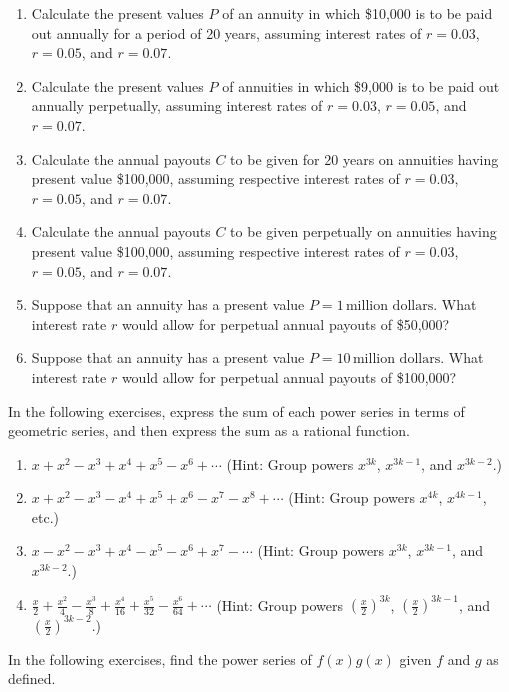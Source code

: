 \documentclass{exercises}
\begin{document}
\begin{enumerate}[resume]
\item Calculate the present values $P$ of an annuity in which \$10,000 is to be paid out annually for a period of 20 years, assuming interest rates of $r=0.03$, $r=0.05$, and $r=0.07$.
\item Calculate the present values $P$ of annuities in which \$9,000 is to be paid out annually perpetually, assuming interest rates of $r=0.03$, $r=0.05$, and $r=0.07$.
\item Calculate the annual payouts $C$ to be given for 20 years on annuities having present value \$100,000, assuming respective interest rates of $r=0.03$, $r=0.05$, and $r=0.07$.
\item Calculate the annual payouts $C$ to be given perpetually on annuities having present value \$100,000, assuming respective interest rates of $r=0.03$, $r=0.05$, and $r=0.07$.
\item Suppose that an annuity has a present value $P=1\,\text{million dollars}$. What interest rate $r$ would allow for perpetual annual payouts of \$50,000?
\item Suppose that an annuity has a present value $P=10\,\text{million dollars}$. What interest rate $r$ would allow for perpetual annual payouts of \$100,000?
\end{enumerate}

In the following exercises, express the sum of each power series in terms of geometric series, and then express the sum as a rational function.

\begin{enumerate}[resume]
\item $x+x^{2}-x^{3}+x^{4}+x^{5}-x^{6}+\cdots$ (Hint: Group powers $x^{3k}$, $x^{3k-1}$, and $x^{3k-2}$.)
\item $x+x^{2}-x^{3}-x^{4}+x^{5}+x^{6}-x^{7}-x^{8}+\cdots$ (Hint: Group powers $x^{4k}$, $x^{4k-1}$, etc.)
\item $x-x^{2}-x^{3}+x^{4}-x^{5}-x^{6}+x^{7}-\cdots$ (Hint: Group powers $x^{3k}$, $x^{3k-1}$, and $x^{3k-2}$.)
\item $\frac{x}{2}+\frac{x^{2}}{4}-\frac{x^{3}}{8}+\frac{x^{4}}{16}+\frac{x^{5}}{32}-\frac{x^{6}}{64}+\cdots$ (Hint: Group powers ${(\frac{x}{2})}^{3k}$, ${(\frac{x}{2})}^{3k-1}$, and ${(\frac{x}{2})}^{3k-2}$.)
\end{enumerate}

In the following exercises, find the power series of $f(x)g(x)$ given $f$ and $g$ as defined.
\end{document}
